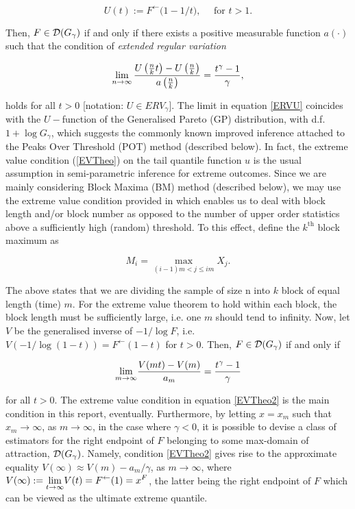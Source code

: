 \begin{equation*}
U(t):=   F^{\leftarrow} \bigl( 1-1/t\bigr), \quad \mbox{ for } t >  1.
\end{equation*}


Then, $F\in {\ensuremath{\mathcal{D}}}(G_{\gamma})$ if and only if there exists a positive  measurable function $a(\cdot)$ such that the condition of \emph{extended regular variation}


\begin{equation}\label{ERVU}
	\displaystyle {\lim_{n \rightarrow{\infty}}}\,\frac{U\left(\frac{n}{k}t\right)-U\left(\frac{n}{k}\right)}{a\left(\frac{n}{k}\right)}= \frac{t^{\gamma}-1}{\gamma},
\end{equation}


holds for all $t>0$ [notation: $U\in ERV_{\gamma}$]. The limit in equation \ref{ERVU} coincides with the $U-$function of the Generalised Pareto (GP) distribution, with d.f. $ 1+ \log G_ \gamma $, which suggests the commonly known improved inference attached to the Peaks Over Threshold (POT) method (described below). In fact, the extreme value condition (\ref{EVTheo}) on the tail quantile function $ u $ is the usual assumption in semi-parametric inference for extreme outcomes. Since we are mainly considering Block Maxima (BM) method (described below), we may use the extreme value condition provided in \citet{FdeH:15} which enables us to deal with block length and/or block number as opposed to the number of upper order statistics above a sufficiently high (random) threshold. To this effect, define the $ k^{\text{th}} $ block maximum as 

\begin{equation}
M_i = \max _{(i -1) m < j \le i m} X_j.
\end{equation}

The above states that we are dividing the sample of size n into $k$ block of equal length (time) $m$. For the extreme value theorem to hold within each block, the block length must be sufficiently large, i.e. one $m$ should tend to infinity. Now, let $V$ be the generalised inverse of $ -1/\log F $, i.e. $ V(-1 / \log( 1 - t ) ) = F^{\leftarrow}( 1 - t )$ for $ t > 0 $. Then, $F \in {\ensuremath{\mathcal{D}}} ( G_\gamma )$ if and only if


\begin{equation} \label{EVTheo2}
\displaystyle {\lim_{m \rightarrow{\infty}}} \frac{V(mt) - V(m)}{a_m} = \frac{t^\gamma - 1}{\gamma}
\end{equation}

\noindent for all $ t > 0 $. The extreme value condition in equation \ref{EVTheo2} is the main condition in this report, eventually. Furthermore, by letting $ x = x_m $ such that $ x_m \rightarrow \infty $, as $ m \rightarrow \infty $, in the case where $ \gamma < 0 $, it is possible to devise a class of estimators for the right endpoint of $F$ belonging to some max-domain of attraction, $ {\mathcal{D}} (G_\gamma) $.  Namely, condition \ref{EVTheo2} gives rise to the approximate equality $ V(\infty) \approx V(m) - a_m / \gamma $, as $ m \rightarrow \infty $, where $ V(\infty ) := \displaystyle {\lim_{t \rightarrow{\infty}}} V(t) = F^{\leftarrow}(1) = x^F $, the latter being the right endpoint of $F$ which can be viewed as the ultimate extreme quantile.


